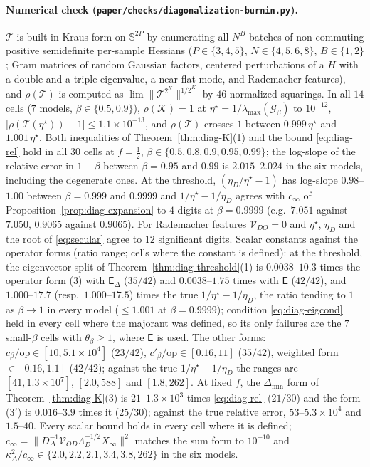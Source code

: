 \documentclass[11pt]{article}
\theoremstyle{remark}
\begin{document}
\paragraph{Numerical check (\texttt{paper/checks/diagonalization-burnin.py}).} $\mathcal T$ is built in Kraus form on $\mathbb S^{2P}$ by enumerating all $N^B$ batches of non-commuting positive semidefinite per-sample Hessians ($P\in\{3,4,5\}$, $N\in\{4,5,6,8\}$, $B\in\{1,2\}$; Gram matrices of random Gaussian factors, centered perturbations of a $H$ with a double and a triple eigenvalue, a near-flat mode, and Rademacher features), and $\rho(\mathcal T)$ is computed as $\lim\|\mathcal T^{2^K}\|^{1/2^K}$ by $46$ normalized squarings. In all $14$ cells ($7$ models, $\beta\in\{0.5,0.9\}$), $\rho(\mathcal K)=1$ at $\eta^\star=1/\lambda_{\max}(\mathcal G_\beta)$ to $10^{-12}$, $|\rho(\mathcal T(\eta^\star))-1|\le1.1\times10^{-13}$, and $\rho(\mathcal T)$ crosses $1$ between $0.999\,\eta^\star$ and $1.001\,\eta^\star$. Both inequalities of Theorem~\ref{thm:diag-K}(1) and the bound \eqref{eq:diag-rel} hold in all $30$ cells at $f=\frac12$, $\beta\in\{0.5,0.8,0.9,0.95,0.99\}$; the log-slope of the relative error in $1-\beta$ between $\beta=0.95$ and $0.99$ is $2.015$--$2.024$ in the six models, including the degenerate ones. At the threshold, $(\eta_D/\eta^\star-1)$ has log-slope $0.98$--$1.00$ between $\beta=0.999$ and $0.9999$ and $1/\eta^\star-1/\eta_D$ agrees with $c_\infty$ of Proposition~\ref{prop:diag-expansion} to $4$ digits at $\beta=0.9999$ (e.g.\ $7.051$ against $7.050$, $0.9065$ against $0.9065$). For Rademacher features $\mathcal V_{DO}=0$ and $\eta^\star$, $\eta_D$ and the root of \eqref{eq:secular} agree to $12$ significant digits. Scalar constants against the operator forms (ratio range; cells where the constant is defined): at the threshold, the eigenvector split of Theorem~\ref{thm:diag-threshold}(1) is $0.0038$--$10.3$ times the operator form (3) with $\mathsf E_\Delta$ ($35/42$) and $0.0038$--$1.75$ times with $\bar{\mathsf E}$ ($42/42$), and $1.000$--$17.7$ (resp.\ $1.000$--$17.5$) times the true $1/\eta^\star-1/\eta_D$, the ratio tending to $1$ as $\beta\to1$ in every model ($\le1.001$ at $\beta=0.9999$); condition \eqref{eq:diag-eigcond} held in every cell where the majorant was defined, so its only failures are the $7$ small-$\beta$ cells with $\theta_\beta\ge1$, where $\bar{\mathsf E}$ is used. The other forms: $c_\beta/\text{op}\in[10,5.1\times10^4]$ ($23/42$), $c'_\beta/\text{op}\in[0.16,11]$ ($35/42$), weighted form $\in[0.16,1.1]$ ($42/42$); against the true $1/\eta^\star-1/\eta_D$ the ranges are $[41,1.3\times10^7]$, $[2.0,588]$ and $[1.8,262]$. At fixed $f$, the $\Delta_{\min}$ form of Theorem~\ref{thm:diag-K}(3) is $21$--$1.3\times10^3$ times \eqref{eq:diag-rel} ($21/30$) and the form (3$'$) is $0.016$--$3.9$ times it ($25/30$); against the true relative error, $53$--$5.3\times10^4$ and $1.5$--$40$. Every scalar bound holds in every cell where it is defined; $c_\infty=\|D_\Delta^{-1}\mathcal V_{OD}\Lambda_D^{-1/2}X_\infty\|^2$ matches the sum form to $10^{-10}$ and $\kappa_\Delta^2/c_\infty\in\{2.0,2.2,2.1,3.4,3.8,262\}$ in the six models.
\end{document}
